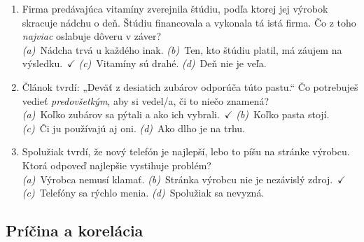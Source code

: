 \begin{enumerate}[nosep, label=K\arabic*.]
    \item Firma predávajúca vitamíny zverejnila štúdiu, podľa ktorej jej výrobok skracuje nádchu o deň. Štúdiu financovala a vykonala tá istá firma. Čo z toho \emph{najviac} oslabuje dôveru v záver?\\
    \textit{(a)}~Nádcha trvá u každého inak. \quad \textit{(b)}~Ten, kto štúdiu platil, má záujem na výsledku.~$\checkmark$ \quad \textit{(c)}~Vitamíny sú drahé. \quad \textit{(d)}~Deň nie je veľa.

    \item Článok tvrdí: „Deväť z desiatich zubárov odporúča túto pastu.“ Čo potrebuješ vedieť \emph{predovšetkým}, aby si vedel/a, či to niečo znamená?\\
    \textit{(a)}~Koľko zubárov sa pýtali a ako ich vybrali.~$\checkmark$ \quad \textit{(b)}~Koľko pasta stojí. \quad \textit{(c)}~Či ju používajú aj oni. \quad \textit{(d)}~Ako dlho je na trhu.

    \item Spolužiak tvrdí, že nový telefón je najlepší, lebo to píšu na stránke výrobcu. Ktorá odpoveď najlepšie vystihuje problém?\\
    \textit{(a)}~Výrobca nemusí klamať. \quad \textit{(b)}~Stránka výrobcu nie je nezávislý zdroj.~$\checkmark$ \quad \textit{(c)}~Telefóny sa rýchlo menia. \quad \textit{(d)}~Spolužiak sa nevyzná.
\end{enumerate}

\subsection*{Príčina a korelácia}


